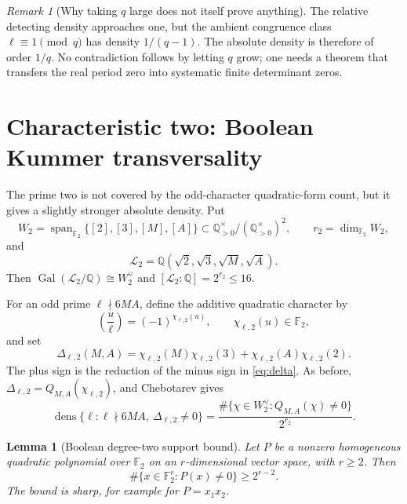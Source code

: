 \documentclass[11pt]{article}
\numberwithin{equation}{section}
\newtheorem{lemma}[theorem]{Lemma}
\theoremstyle{definition}
\theoremstyle{remark}
\newtheorem{remark}[theorem]{Remark}
\newcommand{\Q}{\mathbb Q}
\newcommand{\F}{\mathbb F}
\newcommand{\Gal}{\operatorname{Gal}}
\newcommand{\Span}{\operatorname{span}}
\newcommand{\dens}{\operatorname{dens}}
\begin{document}
\begin{remark}[Why taking \(q\) large does not itself prove anything]
The relative detecting density approaches one, but the ambient congruence class
\(\ell\equiv1\pmod q\) has density \(1/(q-1)\).  The absolute density is therefore of order
\(1/q\).  No contradiction follows by letting \(q\) grow; one needs a theorem that transfers
the real period zero into systematic finite determinant zeros.
\end{remark}

\section{Characteristic two: Boolean Kummer transversality}
\label{sec:char2}

The prime two is not covered by the odd-character quadratic-form count, but it gives a
slightly stronger absolute density.  Put
\[
 W_2=\Span_{\F_2}\{[2],[3],[M],[A]\}
 \subset \Q_{>0}^{\times}/(\Q_{>0}^{\times})^2,
 \qquad r_2=\dim_{\F_2}W_2,
\]
and
\begin{equation}
 \mathcal L_2=\Q(\sqrt2,\sqrt3,\sqrt M,\sqrt A).
 \label{eq:L2}
\end{equation}
Then \(\Gal(\mathcal L_2/\Q)\cong W_2^\vee\) and
\([\mathcal L_2:\Q]=2^{r_2}\le16\).

For an odd prime \(\ell\nmid6MA\), define the additive quadratic character by
\[
 \left(\frac{u}{\ell}\right)=(-1)^{\chi_{\ell,2}(u)},
 \qquad \chi_{\ell,2}(u)\in\F_2,
\]
and set
\begin{equation}
 \Delta_{\ell,2}(M,A)
 =\chi_{\ell,2}(M)\chi_{\ell,2}(3)
  +\chi_{\ell,2}(A)\chi_{\ell,2}(2).
 \label{eq:delta2}
\end{equation}
The plus sign is the reduction of the minus sign in \eqref{eq:delta}.  As before,
\(\Delta_{\ell,2}=Q_{M,A}(\chi_{\ell,2})\), and Chebotarev gives
\begin{equation}
 \dens\{\ell:\ell\nmid6MA,\ \Delta_{\ell,2}\ne0\}
 =\frac{\#\{\chi\in W_2^\vee:Q_{M,A}(\chi)\ne0\}}{2^{r_2}}.
 \label{eq:density2exact}
\end{equation}

\begin{lemma}[Boolean degree-two support bound]
\label{lem:booleanweight}
Let \(P\) be a nonzero homogeneous quadratic polynomial over \(\F_2\) on an
\(r\)-dimensional vector space, with \(r\ge2\).  Then
\begin{equation}
 \#\{x\in\F_2^r:P(x)\ne0\}\ge2^{r-2}.
 \label{eq:booleanweight}
\end{equation}
The bound is sharp, for example for \(P=x_1x_2\).
\end{lemma}
\end{document}
